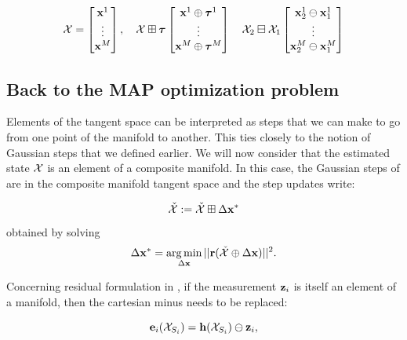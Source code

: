 \begin{equation}
    \mathcal{X}=
    \begin{bmatrix}
        {\bf x}^1 \\
        \vdots \\
        {\bf x}^M
    \end{bmatrix},
    \quad
    \mathcal{X} \boxplus {\bm \tau}
    \begin{bmatrix}
        {\bf x}^1 \oplus {\bm \tau}^1 \\
        \vdots \\
        {\bf x}^M \oplus {\bm \tau}^M
    \end{bmatrix}
    \quad
    \mathcal{X}_2 \boxminus \mathcal{X}_1
    \begin{bmatrix}
        {\bf x}^1_2 \ominus {\bf x}^1_1 \\
        \vdots \\
        {\bf x}^M_2 \ominus {\bf x}^M_1
    \end{bmatrix}
\end{equation}



\subsection{Back to the MAP optimization problem}
\label{sec:manifold_GN}
Elements of the tangent space can be interpreted as steps that we can make to go from one point of the manifold to another.
This ties closely to the notion of Gaussian steps that we defined earlier. We will now consider that the estimated state $\mathcal{X}$
is an element of a composite manifold. In this case, the Gaussian steps of 
are in the composite manifold tangent space and the step updates write:

\begin{equation}
    \check{\mathcal{X}} := \check{\mathcal{X}} \boxplus \Delta {\bf x}^*
\end{equation}
%
obtained by solving
%
\begin{equation}
    \Delta {\bf x}^* = \operatorname*{arg\,min}_{\Delta {\bf x}} ||{\bf r}(\check{\mathcal{X}} \oplus \Delta {\bf x})||^2.
\end{equation}


Concerning residual formulation in , if the measurement ${\bf z}_i$ is itself an element of a manifold, then the cartesian minus needs to be replaced:

\begin{equation}
    {\bf e}_i(\mathcal{X}_{S_i}) = {\bf h}(\mathcal{X}_{S_i}) \ominus {\bf z}_i,
\end{equation}

